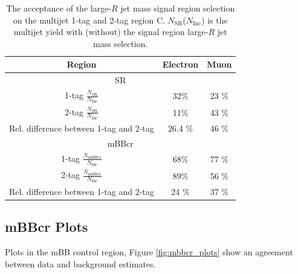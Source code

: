 \begin{table}[!htbp]
\begin{center}
\begin{tabular}{c|c|c}
\hline
Region    & Electron          & Muon      \\
\hline
\multicolumn{3}{c}{SR} \\
\hline
1-tag $\frac{N_\text{SR}}{N_\text{Inc}}$ &  32\% & 23 \% \\
2-tag $\frac{N_\text{SR}}{N_\text{Inc}}$ &  11\% & 43 \% \\
\hline \hline
Rel. difference between 1-tag and 2-tag & 26.4 \% & 46 \% \\
\hline
\multicolumn{3}{c}{mBBcr} \\
\hline
1-tag $\frac{N_\text{mBBcr}}{N_\text{Inc}}$ &  68\% & 77 \% \\
2-tag $\frac{N_\text{mBBcr}}{N_\text{Inc}}$ &  89\% & 56 \% \\
\hline \hline
Rel. difference between 1-tag and 2-tag &  24 \% &   37 \% \\
\end{tabular}
\end{center}
\caption{The acceptance of the large-$R$ jet mass signal region selection on the multijet
1-tag and 2-tag region C. $N_\text{SR}$($N_\text{Inc}$) is the multijet yield
with (without) the signal region large-$R$ jet mass selection.}
\label{tab:boosted_syst_qcd_norm_mBBAcc}
\end{table}
 
\subsection{mBBcr Plots}
Plots in the mBB control region, Figure \ref{fig:mbbcr_plots} show an agreement between data and background estimates.


